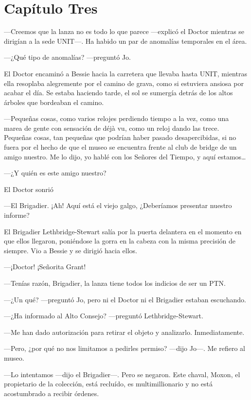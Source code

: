 \chapter*{Capítulo Tres}

---Creemos que la lanza no es todo lo que parece ---explicó el Doctor
mientras se dirigían a la sede UNIT---. Ha habido un par de anomalías
temporales en el área.

---¿Qué tipo de anomalías? ---preguntó Jo.

El Doctor encaminó a Bessie hacia la carretera que llevaba hasta UNIT,
mientras ella resoplaba alegremente por el camino de grava, como si
estuviera ansiosa por acabar el día. Se estaba haciendo tarde, el sol se
sumergía detrás de los altos árboles que bordeaban el camino.

---Pequeñas cosas, como varios relojes perdiendo tiempo a la vez, como
una marea de gente con sensación de déjà vu, como un reloj dando las
trece. Pequeñas cosas, tan pequeñas que podrían haber pasado
desapercibidas, si no fuera por el hecho de que el museo se encuentra
frente al club de bridge de un amigo nuestro. Me lo dijo, yo hablé con
los Señores del Tiempo, y aquí estamos\ldots{}

---¿Y quién es este amigo nuestro?

El Doctor sonrió

---El Brigadier. ¡Ah! Aquí está el viejo galgo, ¿Deberíamos presentar
nuestro informe?

El Brigadier Lethbridge-Stewart salía por la puerta delantera en el
momento en que ellos llegaron, poniéndose la gorra en la cabeza con la
misma precisión de siempre. Vio a Bessie y se dirigió hacia ellos.

---¡Doctor! ¡Señorita Grant!

---Tenías razón, Brigadier, la lanza tiene todos los indicios de ser un
PTN.

---¿Un qué? ---preguntó Jo, pero ni el Doctor ni el Brigadier estaban
escuchando.

---¿Ha informado al Alto Consejo? ---preguntó Lethbridge-Stewart.

---Me han dado autorización para retirar el objeto y analizarlo.
Inmediatamente.

---Pero, ¿por qué no nos limitamos a pedirles permiso? ---dijo Jo---. Me
refiero al museo.

---Lo intentamos ---dijo el Brigadier---. Pero se negaron. Este chaval,
Moxon, el propietario de la colección, está recluído, es
multimillionario y no está acostumbrado a recibir órdenes.

